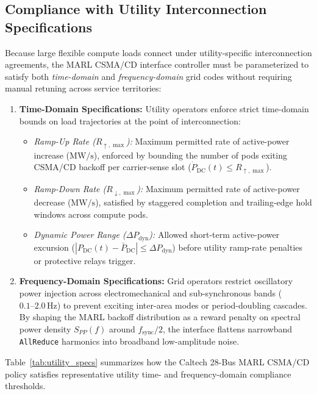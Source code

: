 \documentclass[11pt,fleqn]{article}
\begin{document}
\subsection{Compliance with Utility Interconnection Specifications}
Because large flexible compute loads connect under utility-specific interconnection agreements, the MARL CSMA/CD interface controller must be parameterized to satisfy both \emph{time-domain} and \emph{frequency-domain} grid codes without requiring manual retuning across service territories:
\begin{enumerate}
    \item \textbf{Time-Domain Specifications:} Utility operators enforce strict time-domain bounds on load trajectories at the point of interconnection:
    \begin{itemize}
        \item \emph{Ramp-Up Rate ($R_{\uparrow,\max}$):} Maximum permitted rate of active-power increase ($\mathrm{MW/s}$), enforced by bounding the number of pods exiting CSMA/CD backoff per carrier-sense slot ($\dot{P}_{\mathrm{DC}}(t) \le R_{\uparrow,\max}$).
        \item \emph{Ramp-Down Rate ($R_{\downarrow,\max}$):} Maximum permitted rate of active-power decrease ($\mathrm{MW/s}$), satisfied by staggered completion and trailing-edge hold windows across compute pods.
        \item \emph{Dynamic Power Range ($\Delta P_{\mathrm{dyn}}$):} Allowed short-term active-power excursion ($|P_{\mathrm{DC}}(t) - \bar{P}_{\mathrm{DC}}| \le \Delta P_{\mathrm{dyn}}$) before utility ramp-rate penalties or protective relays trigger.
    \end{itemize}
    \item \textbf{Frequency-Domain Specifications:} Grid operators restrict oscillatory power injection across electromechanical and sub-synchronous bands ($0.1\text{--}2.0\,\mathrm{Hz}$) to prevent exciting inter-area modes or period-doubling cascades. By shaping the MARL backoff distribution as a reward penalty on spectral power density $S_{PP}(f)$ around $f_{\mathrm{sync}}/2$, the interface flattens narrowband \texttt{AllReduce} harmonics into broadband low-amplitude noise.
\end{enumerate}

Table~\ref{tab:utility_specs} summarizes how the Caltech 28-Bus MARL CSMA/CD policy satisfies representative utility time- and frequency-domain compliance thresholds.
\end{document}
